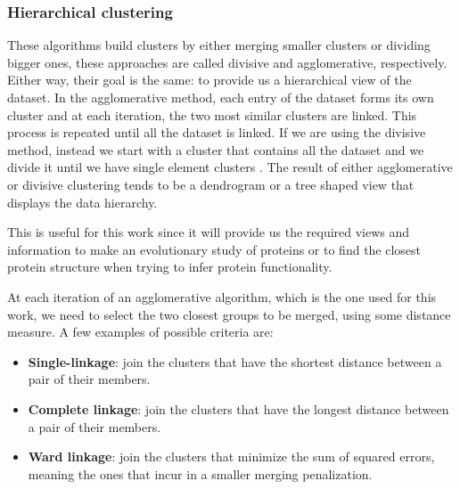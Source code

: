 \medskip
\subsubsection{Hierarchical clustering}

These algorithms build clusters by either merging smaller clusters or dividing bigger ones, these approaches are called divisive and agglomerative, respectively. Either way, their goal is the same: to provide us a hierarchical view of the dataset. In the agglomerative method, each entry of the dataset forms its own cluster and at each iteration, the two most similar clusters are linked. This process is repeated until all the dataset is linked. If we are using the divisive method, instead we start with a cluster that contains all the dataset and we divide it until we have single element clusters \cite{jain1999data}. The result of either agglomerative or divisive clustering tends to be a dendrogram or a tree shaped view that displays the data hierarchy. 

This is useful for this work since it will provide us the required views and information to make an evolutionary study of proteins or to find the closest protein structure when trying to infer protein functionality.

At each iteration of an agglomerative algorithm, which is the one used for this work, we need to select the two closest groups to be merged, using some distance measure. A few examples of possible criteria are:

\begin{itemize}
	\item \textbf{Single-linkage}: join the clusters that have the shortest distance between a pair of their members.
	\item \textbf{Complete linkage}: join the clusters that have the longest distance between a pair of their members.
	\item \textbf{Ward linkage}: join the clusters that minimize the sum of squared errors, meaning the ones that incur in a smaller merging penalization.
\end{itemize}


